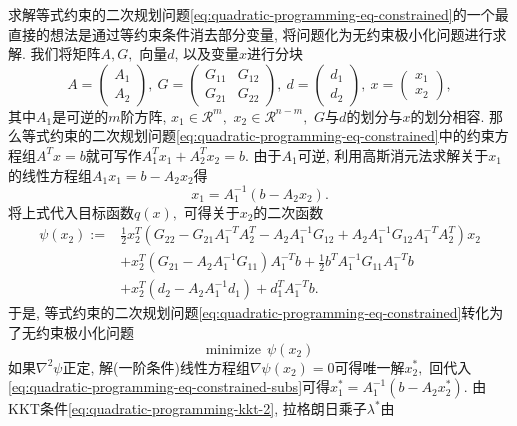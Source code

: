 \documentclass{SBCbookchapter}
\newcommand{\R}{\mathcal{R}}
\begin{document}
求解等式约束的二次规划问题\eqref{eq:quadratic-programming-eq-constrained}的一个最直接的想法是通过等约束条件消去部分变量, 将问题化为无约束极小化问题进行求解. 我们将矩阵$A, G,$ 向量$d$, 以及变量$x$进行分块
\begin{equation*}
A = \begin{pmatrix} A_1 \\ A_2 \end{pmatrix}, ~ G = \begin{pmatrix} G_{11} & G_{12} \\ G_{21} & G_{22} \end{pmatrix}, ~ d = \begin{pmatrix} d_1 \\ d_2 \end{pmatrix}, ~ x = \begin{pmatrix} x_1 \\ x_2 \end{pmatrix},
\end{equation*}
其中$A_1$是可逆的$m$阶方阵, $x_1 \in \R^{m},$ $x_2 \in \R^{n-m},$ $G$与$d$的划分与$x$的划分相容. 那么等式约束的二次规划问题\eqref{eq:quadratic-programming-eq-constrained}中的约束方程组$A^T x = b$就可写作$A_1^T x_1 + A_2^T x_2 = b.$ 由于$A_1$可逆, 利用高斯消元法求解关于$x_1$的线性方程组$A_1x_1 = b - A_2x_2$得
\begin{equation}
\label{eq:quadratic-programming-eq-constrained-subs}
x_1 = A_1^{-1} (b - A_2x_2).
\end{equation}
将上式代入目标函数$q(x),$ 可得关于$x_2$的二次函数
\begin{equation}
\begin{aligned}
\psi (x_2) := & \frac{1}{2} x_2^T \left( G_{22} - G_{21} A_1^{-T} A_2^T - A_2 A_1^{-1} G_{12} + A_2 A_1^{-1} G_{12} A_1^{-T} A_2^T \right) x_2 \\
& + x_2^T \left( G_{21} - A_2 A_1^{-1} G_{11} \right) A_1^{-T} b + \frac{1}{2} b^T A_1^{-1} G_{11} A_1^{-T} b \\
& + x_2^T \left( d_2 - A_2 A_1^{-1} d_1 \right) + d_1^T A_1^{-T} b.
\end{aligned}
\end{equation}
于是, 等式约束的二次规划问题\eqref{eq:quadratic-programming-eq-constrained}转化为了无约束极小化问题
\begin{equation*}
\text{minimize} ~~ \psi(x_2)
\end{equation*}
如果$\nabla^2 \psi$正定, 解(一阶条件)线性方程组$\nabla \psi (x_2) = 0$可得唯一解$x_2^*,$ 回代入\eqref{eq:quadratic-programming-eq-constrained-subs}可得$x_1^* = A_1^{-1} (b - A_2x_2^*).$ 由KKT条件\eqref{eq:quadratic-programming-kkt-2}, 拉格朗日乘子$\lambda^*$由
\end{document}

